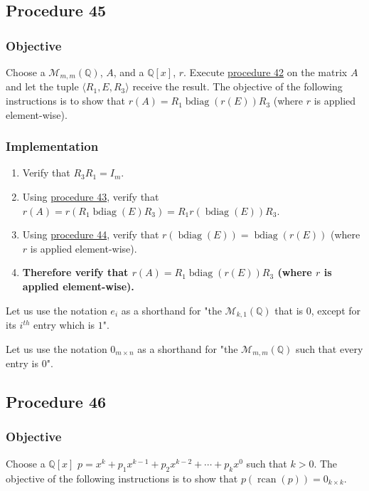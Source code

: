 \documentclass[twocolumn]{article}
\DeclareMathOperator{\bdiag}{bdiag}
\DeclareMathOperator{\rcan}{rcan}
\begin{document}
		\subsection{Procedure 45}\label{sec:procedure 45}
			\subsubsection{Objective}
				Choose a $\mathcal{M}_{m,m}(\mathbb{Q})$, $A$, and a $\mathbb{Q}[x]$, $r$. Execute \hyperref[sec:procedure 42]{procedure 42} on the matrix $A$ and let the tuple $\langle R_1,E,R_3\rangle$ receive the result. The objective of the following instructions is to show that $r(A)=R_1\bdiag(r(E))R_3$ (where $r$ is applied element-wise).
			\subsubsection{Implementation}
				\begin{enumerate}
					\item Verify that $R_3R_1=I_m$.
					\item Using \hyperref[sec:procedure 43]{procedure 43}, verify that $r(A)=r(R_1\bdiag(E)R_3)=R_1r(\bdiag(E))R_3$.
					\item Using \hyperref[sec:procedure 44]{procedure 44}, verify that $r(\bdiag(E))=\bdiag(r(E))$ (where $r$ is applied element-wise).
					\item \textbf{Therefore verify that $r(A)=R_1\bdiag(r(E))R_3$ (where $r$ is applied element-wise).}
				\end{enumerate}
		Let us use the notation $e_i$ as a shorthand for "the $\mathcal{M}_{k,1}(\mathbb{Q})$ that is $0$, except for its $i^{th}$ entry which is $1$".
		
		Let us use the notation $0_{m\times n}$ as a shorthand for "the $\mathcal{M}_{m,m}(\mathbb{Q})$ such that every entry is $0$".
		\subsection{Procedure 46}\label{sec:procedure 46}
			\subsubsection{Objective}
				Choose a $\mathbb{Q}[x]$ $p=x^k+p_1x^{k-1}+p_2x^{k-2}+\cdots+p_kx^0$ such that $k>0$. The objective of the following instructions is to show that $p(\rcan(p))=0_{k\times k}$.
\end{document}
